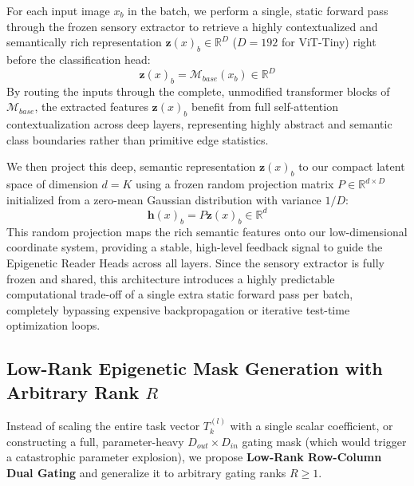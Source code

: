 For each input image $x_b$ in the batch, we perform a single, static forward pass through the frozen sensory extractor to retrieve a highly contextualized and semantically rich representation $\mathbf{z}(x)_b \in \mathbb{R}^D$ ($D=192$ for ViT-Tiny) right before the classification head:
\begin{equation}
    \mathbf{z}(x)_b = \mathcal{M}_{base}(x_b) \in \mathbb{R}^D
\end{equation}
By routing the inputs through the complete, unmodified transformer blocks of $\mathcal{M}_{base}$, the extracted features $\mathbf{z}(x)_b$ benefit from full self-attention contextualization across deep layers, representing highly abstract and semantic class boundaries rather than primitive edge statistics.

We then project this deep, semantic representation $\mathbf{z}(x)_b$ to our compact latent space of dimension $d = K$ using a frozen random projection matrix $P \in \mathbb{R}^{d \times D}$ initialized from a zero-mean Gaussian distribution with variance $1/D$:
\begin{equation}
    \mathbf{h}(x)_b = P \mathbf{z}(x)_b \in \mathbb{R}^d
\end{equation}
This random projection maps the rich semantic features onto our low-dimensional coordinate system, providing a stable, high-level feedback signal to guide the Epigenetic Reader Heads across all layers. Since the sensory extractor is fully frozen and shared, this architecture introduces a highly predictable computational trade-off of a single extra static forward pass per batch, completely bypassing expensive backpropagation or iterative test-time optimization loops.

\subsection{Low-Rank Epigenetic Mask Generation with Arbitrary Rank $R$}
Instead of scaling the entire task vector $T_k^{(l)}$ with a single scalar coefficient, or constructing a full, parameter-heavy $D_{out} \times D_{in}$ gating mask (which would trigger a catastrophic parameter explosion), we propose \textbf{Low-Rank Row-Column Dual Gating} and generalize it to arbitrary gating ranks $R \ge 1$. 

